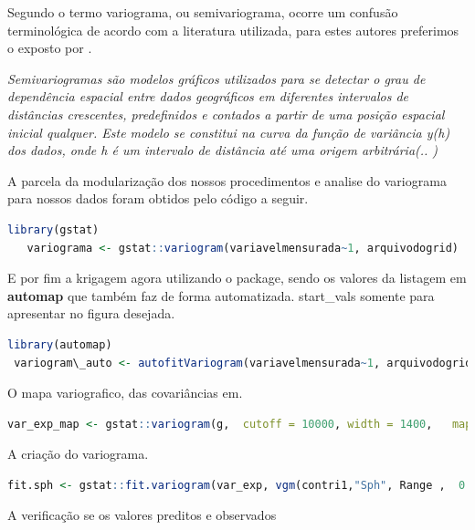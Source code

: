 \hspace*{1.25 cm}  Segundo \cite[P.35]{Yamamoto} o termo variograma, ou semivariograma, ocorre um confusão terminológica de acordo com a literatura utilizada, para estes autores preferimos o exposto por \cite[p.228]{Ferreira}.  \begin{quoting}[rightmargin=0cm,leftmargin=2cm]
	\begin{singlespace}
		{
	\textit{Semivariogramas são modelos gráficos utilizados para se detectar o grau de dependência espacial entre dados geográficos em diferentes intervalos de distâncias crescentes, predefinidos e contados a partir de uma posição espacial inicial qualquer. Este modelo se constitui na curva da função de variância y(h) dos dados, onde h é um intervalo de distância até uma origem arbitrária(.. )}
		}
	\end{singlespace}
\end{quoting}
%
\hspace*{1.25 cm} A  parcela da modularização dos nossos procedimentos e analise do variograma para nossos dados foram obtidos pelo código a seguir.  
 \lstset{
	language=R, %
	caption= Producao do variogramas em linguagem R,} %
\begin{lstlisting}[language=R]
	library(gstat)
   variograma <- gstat::variogram(variavelmensurada~1, arquivodogrid)
\end{lstlisting}  
\hspace*{1.25 cm}  E por fim a krigagem agora utilizando o package, sendo os valores da listagem em  \textbf{\textcolor{blue!55!black}{automap}} que também faz de forma automatizada. start\_vals somente para apresentar no figura desejada.
  \lstset{
 	language=R, %
 	caption= Auto ajuste do Variograma em linguagem R,} %
 \begin{lstlisting}[language=R]
   library(automap)
 variogram\_auto <- autofitVariogram(variavelmensurada~1, arquivodogrid, start\_vals=c(variogramar\$nugget, variogramar\$cov.pars[2], variograma\$cov.pars[1]))
 \end{lstlisting}  
 \hspace*{1.25 cm}   O mapa variografico, das covariâncias em.
  \lstset{
	language=R, %
	caption= Mapa variografico em linguagem R,} %
\begin{lstlisting}[language=R]
	var_exp_map <- gstat::variogram(g, 	cutoff = 10000,	width = 1400, 	map = T)
\end{lstlisting}  
  \hspace*{1.25 cm}   A criação do variograma.
   \lstset{
 	language=R, %
 	caption= Variograma utilizando funcao esférica em linguagem R,} %
 \begin{lstlisting}[language=R]
 	fit.sph <- gstat::fit.variogram(var_exp, vgm(contri1,"Sph", Range ,  0.01))
 \end{lstlisting}  
  \hspace*{1.25 cm} A verificação se os valores preditos e observados


